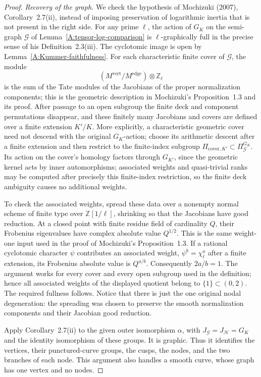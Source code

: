 \begin{proof}
\emph{Recovery of the graph.}
We check the hypothesis of Mochizuki (2007), Corollary~2.7(ii),
instead of imposing preservation of logarithmic inertia that is not
present in the right side. For any prime $\ell$, the action of $G_K$
on the semi-graph $\mathcal G$ of Lemma~\ref{A:tensor-log-comparison}
is $\ell$-graphically full in the precise sense of his
Definition~2.3(iii). The cyclotomic image is open by
Lemma~\ref{A:Kummer-faithfulness}. For each characteristic finite
cover of $\mathcal G$, the module
\[
 (M^{\mathrm{vert}}/M^{\mathrm{edge}})\otimes\mathbb Z_\ell
\]
is the sum of the Tate modules of the Jacobians of the proper
normalization components; this is the geometric description in
Mochizuki's Proposition~1.3 and its proof. After passage to an open
subgroup the finite deck and component permutations disappear, and
these finitely many Jacobians and covers are defined over a finite
extension $K'/K$.
More explicitly, a characteristic geometric cover need not descend
with the original $G_K$-action; choose its arithmetic descent after a
finite extension and then restrict to the finite-index subgroup
$\Pi_{\mathrm{cover},K'}\subset\Pi_{\mathcal G}^{G_K}$.
Its action on the cover's homology factors through $G_{K'}$, since
the geometric kernel acts by inner automorphisms; associated weights
and quasi-trivial ranks may be computed after precisely this
finite-index restriction, so the finite deck ambiguity causes no
additional weights.

To check the associated weights, spread these data over a nonempty
normal scheme of finite type over $\mathbb Z[1/\ell]$, shrinking so
that the Jacobians have good reduction. At a closed point with finite
residue field of cardinality $Q$, their Frobenius eigenvalues have
complex absolute value $Q^{1/2}$. This is the same weight-one input
used in the proof of Mochizuki's Proposition~1.3. If a rational
cyclotomic character $\psi$ contributes an associated weight,
$\psi^b=\chi_\ell^a$ after a finite extension, its Frobenius absolute
value is $Q^{a/b}$. Consequently $2a/b=1$. The argument works for
every cover and every open subgroup used in the definition; hence
all associated weights of the displayed quotient belong to
$\{1\}\subset(0,2)$. The required fullness follows. Notice that
there is just the one original nodal degeneration: the spreading was
chosen to preserve the smooth normalization components and their
Jacobian good reduction.

Apply Corollary~2.7(ii) to the given outer isomorphism $\alpha$, with
$J_{\mathcal G}=J_{\mathcal H}=G_K$ and the identity isomorphism of
these groups. It is graphic. Thus it identifies the vertices, their
punctured-curve groups, the cusps, the nodes, and the two branches of
each node. This argument also handles a smooth curve, whose graph
has one vertex and no nodes.


\end{proof}
